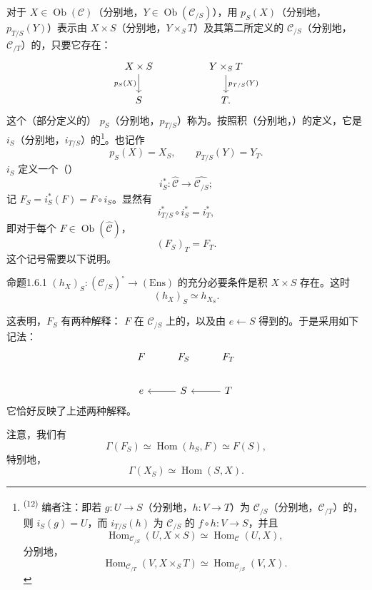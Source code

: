 对于 $X\in\operatorname{Ob}(\mathcal C)$（分别地，$Y\in\operatorname{Ob}(\mathcal C_{/S})$），用 $p_S(X)$（分别地，$p_{T/S}(Y)$）表示由 $X\times S$（分别地，$Y\times_ST$）及其第二所定义的 $\mathcal C_{/S}$（分别地，$\mathcal C_{/T}$）的，只要它存在：
\[
\begin{tikzcd}
X\times S\arrow[d,"p_S(X)"']&&Y\times_ST\arrow[d,"p_{T/S}(Y)"]\\
S&&T.
\end{tikzcd}
\]
这个（部分定义的） $p_S$（分别地，$p_{T/S}$）称为。按照积（分别地，）的定义，它是 $i_S$（分别地，$i_{T/S}$）的\footnote{\textsuperscript{(12)} 编者注：即若 $g:U\to S$（分别地，$h:V\to T$）为 $\mathcal C_{/S}$（分别地，$\mathcal C_{/T}$）的，则 $i_S(g)=U$，而 $i_{T/S}(h)$ 为 $\mathcal C_{/S}$ 的 $f\circ h:V\to S$，并且
\[
\operatorname{Hom}_{\mathcal C_{/S}}(U,X\times S)\simeq\operatorname{Hom}_{\mathcal C}(U,X),
\]
分别地，
\[
\operatorname{Hom}_{\mathcal C_{/T}}(V,X\times_ST)\simeq\operatorname{Hom}_{\mathcal C_{/S}}(V,X).
\]
}。也记作
\[
p_S(X)=X_S,\qquad p_{T/S}(Y)=Y_T.
\]
 $i_S$ 定义一个（）
\[
i_S^*:\widehat{\mathcal C}\longrightarrow\widehat{\mathcal C_{/S}};
\]
记 $F_S=i_S^*(F)=F\circ i_S$。显然有
\[
i_{T/S}^*\circ i_S^*=i_T^*,
\]
即对于每个 $F\in\operatorname{Ob}(\widehat{\mathcal C})$，
\[
(F_S)_T=F_T.
\]
这个记号需要以下说明。
\begin{SGAresult}{命题}{1.6.1}
 $(h_X)_S:(\mathcal C_{/S})^\circ\to(\mathrm{Ens})$ 的充分必要条件是积 $X\times S$ 存在。这时
\[
(h_X)_S\simeq h_{X_S}.
\]
\end{SGAresult}
这表明，$F_S$ 有两种解释： $F$ 在 $\mathcal C_{/S}$ 上的，以及由 $e\leftarrow S$ 得到的。于是采用如下记法：
\[
\begin{tikzcd}
F&F_S&F_T\\
e&S\arrow[l]&T\arrow[l]
\end{tikzcd}
\]
它恰好反映了上述两种解释。

注意，我们有
\[
\Gamma(F_S)\simeq\operatorname{Hom}(h_S,F)\simeq F(S),
\]
特别地，
\[
\Gamma(X_S)\simeq\operatorname{Hom}(S,X).
\]

